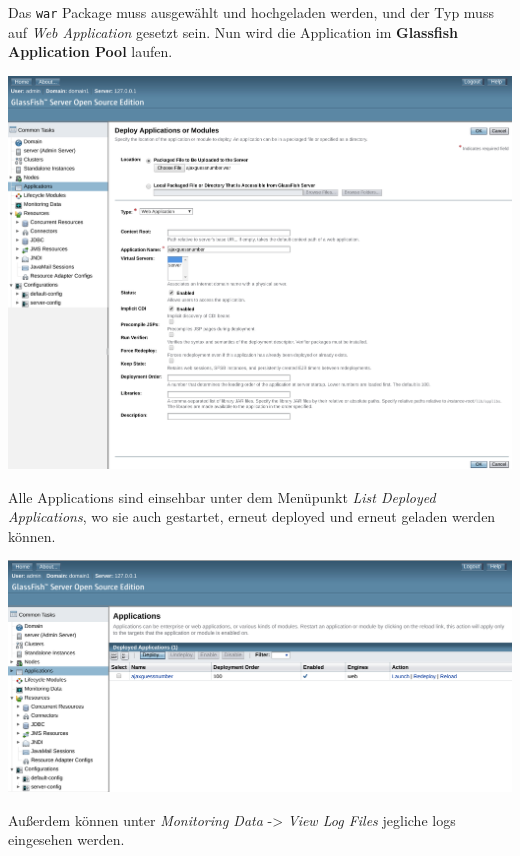 Das \texttt{war} Package muss ausgewählt und hochgeladen werden, und der Typ muss auf \textit{Web Application} gesetzt sein. Nun wird die Application im \textbf{Glassfish Application Pool} laufen.

\includegraphics[width=\textwidth]{images/glassfish-deploy-war}

\clearpage

Alle Applications sind einsehbar unter dem Menüpunkt \textit{List Deployed Applications}, wo sie auch gestartet, erneut deployed und erneut geladen werden können.

\includegraphics[width=\textwidth]{images/glassfish-apps}

Außerdem können unter \textit{Monitoring Data} -> \textit{View Log Files} jegliche logs eingesehen werden.
